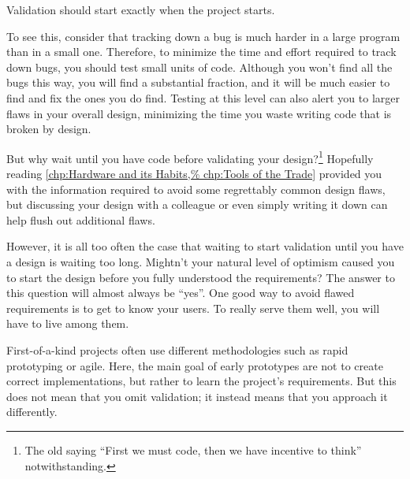 Validation should start exactly when the project starts.

To see this, consider that tracking down a bug is much harder in a large
program than in a small one.
Therefore, to minimize the time and effort required to track down bugs,
you should test small units of code.
Although you won't find all the bugs this way, you will find a substantial
fraction, and it will be much easier to find and fix the ones you do find.
Testing at this level can also alert you to larger flaws in your overall
design, minimizing the time you waste writing code that is broken
by design.

But why wait until you have code before validating your design?\footnote{
	The old saying ``First we must code, then we have incentive to
	think'' notwithstanding.}
Hopefully reading \cref{chp:Hardware and its Habits,%
chp:Tools of the Trade} provided you with the information
required to avoid some regrettably common design flaws,
but discussing your design with a colleague or even simply writing it
down can help flush out additional flaws.

However, it is all too often the case that waiting to start validation
until you have a design is waiting too long.
Mightn't your natural level of optimism caused you to start the design
before you fully understood the requirements?
The answer to this question will almost always be ``yes''.
One good way to avoid flawed requirements is to get to know your users.
To really serve them well, you will have to live among them.

\QuickQuizEnd

First-of-a-kind projects often use different methodologies such as
rapid prototyping or agile.
Here, the main goal of early prototypes are not to create correct
implementations, but rather to learn the project's requirements.
But this does not mean that you omit validation; it instead means that
you approach it differently.


